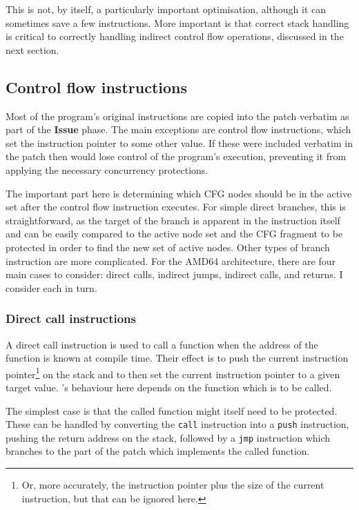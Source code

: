 This is not, by itself, a particularly important optimisation,
although it can sometimes save a few instructions.  More important is
that correct stack handling is critical to correctly handling indirect
control flow operations, discussed in the next section.

\subsection{Control flow instructions}

Most of the program's original instructions are copied into the patch
verbatim as part of the \textbf{Issue} phase.  The main exceptions are
control flow instructions, which set the instruction pointer to some
other value.  If these were included verbatim in the patch then
{\implementation} would lose control of the program's execution,
preventing it from applying the necessary concurrency protections.

The important part here is determining which CFG nodes should be in
the active set after the control flow instruction executes.  For
simple direct branches, this is straightforward, as the target of the
branch is apparent in the instruction itself and can be easily
compared to the active node set and the CFG fragment to be protected
in order to find the new set of active nodes.  Other types of
branch instruction are more complicated.  For the AMD64 architecture,
there are four main cases to consider: direct calls, indirect jumps,
indirect calls, and returns.  I consider each in turn.

\subsubsection{Direct call instructions}

A direct call instruction is used to call a function when the address
of the function is known at compile time.  Their effect is to push the
current instruction pointer\footnote{Or, more accurately, the
  instruction pointer plus the size of the current instruction, but
  that can be ignored here.} on the stack and to then set the current
instruction pointer to a given target value.  {\Implementation}'s
behaviour here depends on the function which is to be called.

The simplest case is that the called function might itself need to be
protected.  These can be handled by converting the \texttt{call}
instruction into a \texttt{push} instruction, pushing the return
address on the stack, followed by a \texttt{jmp} instruction which
branches to the part of the patch which implements the called
function.

